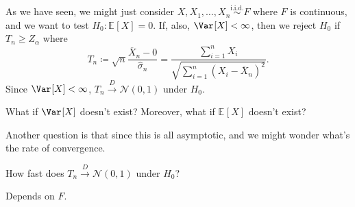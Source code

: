 As we have seen, we might just consider \(X, X_1, \dots , X_n \overset{\text{i.i.d.} }{\sim } F \) where \(F\) is continuous, and we want to test \(H_0 \colon \mathbb{E}_{}[X] = 0\). If, also, \(\Var_{}[X] < \infty \), then we reject \(H_0\) if \(T_n \geq Z_\alpha \) where
\[
	T_n
	\coloneqq \sqrt{n} \frac{\overline{X} _n - 0}{\hat{\sigma} _n}
	= \frac{\sum_{i=1}^{n} X_i}{\sqrt{\sum_{i=1}^{n} (X_i - \overline{X} _n)^2} }.
\]
Since \(\Var_{}[X] < \infty \), \(T_n \overset{D}{\to} \mathcal{N} (0, 1)\) under \(H_0\).

\begin{problem*}
	What if \(\Var_{}[X] \) doesn't exist? Moreover, what if \(\mathbb{E}_{}[X] \) doesn't exist?
\end{problem*}

Another question is that since this is all asymptotic, and we might wonder what's the rate of convergence.

\begin{problem*}
	How fast does \(T_n \overset{D}{\to} \mathcal{N} (0, 1)\) under \(H_0\)?
\end{problem*}
\begin{answer}
	Depends on \(F\).
\end{answer}

